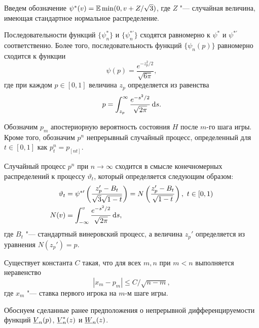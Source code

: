 {Введем обозначение $\psi^*(v) = \operatorname{\mathbb{E}} \min(0, v + Z/\sqrt{3})$, где $Z$ "--- случайная величина, имеющая стандартное нормальное распределение.

\begin{proposition}
Последовательности функций $\{\psi^*_n\}$ и $\{\psi^{*\prime}_n\}$ сходятся равномерно к $\psi^*$ и $\psi^{*\prime}$ соответственно.
Более того, последовательность функций $\{\psi_n(p)\}$ равномерно сходится к функции
\begin{equation*}
  \psi(p) = \frac{e^{-z_p^2/2}}{\sqrt{6\pi}},
\end{equation*}
где при каждом $p \in [0, 1]$ величина $z_p$ определяется из равенства
\begin{equation*}
  p = \int_{z_p}^\infty \frac{e^{-s^2/2}}{\sqrt{2\pi}} \mathop{}\!\mathrm{d} s.
\end{equation*}
\end{proposition}

Обозначим $p_m$ апостериорную вероятность состояния $H$ после $m$-го шага игры.
Кроме того, обозначим $p^n$ непрерывный случайный процесс, определенный для $t \in [0, 1]$ как $p^n_t = p_{[nt]}$.

\begin{proposition}
  Случайный процесс $p^n$ при $n \rightarrow \infty$ сходится в смысле конечномерных распределений к процессу $\vartheta_t$, который определяется следующим образом:
  \begin{align*}
    \vartheta_t &= \psi^{*\prime} \left(
      \frac{z_p' - B_t}{\sqrt{3}\sqrt{1-t}}
    \right) =
    N\left( \frac{z_p' - B_t}{\sqrt{1-t}} \right),\ t \in [0, 1)\\
    N(v) &= \int_{-\infty}^v \frac{e^{-s^2/2}}{\sqrt{2\pi}} \mathop{}\!\mathrm{d} s,
  \end{align*}
  где $B_t$ "--- стандартный винеровский процесс, а величина $z_p'$ определяется из уравнения $N(z_p') = p$.
\end{proposition}

\begin{proposition}
  Существует константа $C$ такая, что для всех $m, n$ при $m < n$ выполняется неравенство
  \begin{equation*}
    | x_m - p_m | \leq C / \sqrt{n - m},
  \end{equation*}
  где $x_m$ "--- ставка первого игрока на $m$-м шаге игры.
\end{proposition}

Обоснуем сделанные ранее предположения о непрерывной дифференцируемости функций $\LV{n}(p)$, $\LV[*]{n}(z)$ и $\LW{n}(z)$.

}

